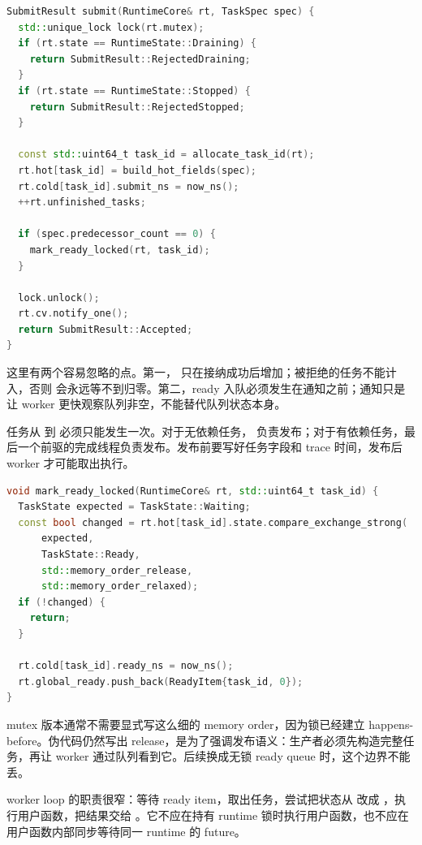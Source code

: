 \begin{lstlisting}[language=C++,caption={submit 的语义伪代码}]
SubmitResult submit(RuntimeCore& rt, TaskSpec spec) {
  std::unique_lock lock(rt.mutex);
  if (rt.state == RuntimeState::Draining) {
    return SubmitResult::RejectedDraining;
  }
  if (rt.state == RuntimeState::Stopped) {
    return SubmitResult::RejectedStopped;
  }

  const std::uint64_t task_id = allocate_task_id(rt);
  rt.hot[task_id] = build_hot_fields(spec);
  rt.cold[task_id].submit_ns = now_ns();
  ++rt.unfinished_tasks;

  if (spec.predecessor_count == 0) {
    mark_ready_locked(rt, task_id);
  }

  lock.unlock();
  rt.cv.notify_one();
  return SubmitResult::Accepted;
}
\end{lstlisting}

这里有两个容易忽略的点。第一， 只在接纳成功后增加；被拒绝的任务不能计入，否则  会永远等不到归零。第二，ready 入队必须发生在通知之前；通知只是让 worker 更快观察队列非空，不能替代队列状态本身。

任务从  到  必须只能发生一次。对于无依赖任务， 负责发布；对于有依赖任务，最后一个前驱的完成线程负责发布。发布前要写好任务字段和 trace 时间，发布后 worker 才可能取出执行。

\begin{lstlisting}[language=C++,caption={发布 ready 任务的伪代码}]
void mark_ready_locked(RuntimeCore& rt, std::uint64_t task_id) {
  TaskState expected = TaskState::Waiting;
  const bool changed = rt.hot[task_id].state.compare_exchange_strong(
      expected,
      TaskState::Ready,
      std::memory_order_release,
      std::memory_order_relaxed);
  if (!changed) {
    return;
  }

  rt.cold[task_id].ready_ns = now_ns();
  rt.global_ready.push_back(ReadyItem{task_id, 0});
}
\end{lstlisting}

mutex 版本通常不需要显式写这么细的 memory order，因为锁已经建立 happens-before。伪代码仍然写出 release，是为了强调发布语义：生产者必须先构造完整任务，再让 worker 通过队列看到它。后续换成无锁 ready queue 时，这个边界不能丢。

worker loop 的职责很窄：等待 ready item，取出任务，尝试把状态从  改成 ，执行用户函数，把结果交给 。它不应在持有 runtime 锁时执行用户函数，也不应在用户函数内部同步等待同一 runtime 的 future。

